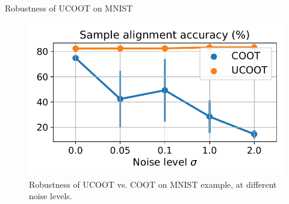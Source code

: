 \documentclass{beamer}
\begin{document}
\begin{frame}{Robustness of UCOOT on MNIST}
  \begin{figure}
    \includegraphics[width=0.7\linewidth,keepaspectratio=true]{OT_new/mnist-sigma.pdf}
    \caption{\scriptsize{Robustness of UCOOT vs. COOT on MNIST example, at different noise levels.}}
  \end{figure}
\end{frame}
\end{document}
